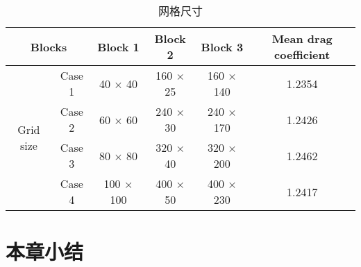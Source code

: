 \begin{table}
	\centering
	\caption{网格尺寸}\label{tab: grid}
	\begin{tabular}{@{}cccccc@{}}
		\toprule
		\multicolumn{2}{c}{Blocks}  & Block 1  & Block 2   & Block 3 & Mean drag coefficient    \\ \midrule
		\multirow{4}{*}{Grid size} 
		& Case 1 & 40 $\times$ 40 & 160 $\times$ 25 & 160 $\times$ 140   & 1.2354 \\
		& Case 2 & 60 $\times$ 60 & 240 $\times$ 30 & 240 $\times$ 170   & 1.2426 \\
		& Case 3 & 80 $\times$ 80 & 320 $\times$ 40 & 320 $\times$ 200   & 1.2462 \\
		& Case 4 & 100 $\times$ 100 & 400 $\times$ 50 & 400 $\times$ 230 & 1.2417 \\
		\bottomrule
	\end{tabular}
\end{table}

\section{本章小结}
